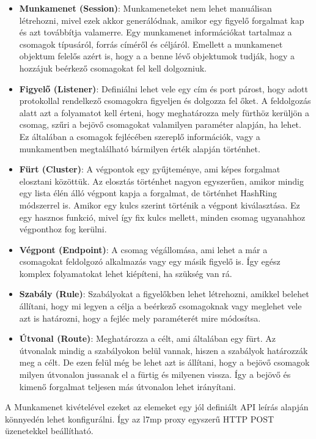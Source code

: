 \begin{itemize}
	\item \textbf{Munkamenet (Session)}: Munkameneteket nem lehet manuálisan létrehozni,
	mivel ezek akkor generálódnak, amikor egy figyelő forgalmat kap és azt 
	továbbítja valamerre. Egy munkamenet információkat tartalmaz a csomagok típusáról,
	forrás címéről és céljáról. Emellett a munkamenet objektum felelős azért is, hogy a
	a benne lévő objektumok tudják, hogy a hozzájuk beérkező csomagokat fel kell dolgozniuk. 
	\item \textbf{Figyelő (Listener)}: Definiálni lehet vele egy cím és port párost, hogy
	adott protokollal rendelkező csomagokra figyeljen és dolgozza fel őket. A feldolgozás
	alatt azt a folyamatot kell érteni, hogy meghatározza mely fürthöz kerüljön a csomag,
	szűri a bejövő csomagokat valamilyen paraméter alapján, ha lehet. Ez általában 
	a csomagok fejlécében szereplő információk, vagy a munkamentben megtalálható bármilyen
	érték alapján történhet. 
	\item \textbf{Fürt (Cluster)}: A végpontok egy gyűjteménye, ami képes forgalmat elosztani
	közöttük. Az elosztás történhet nagyon egyszerűen, amikor mindig egy lista élén álló
	végpont kapja a forgalmat, de történhet HashRing módszerrel is. Amikor egy kulcs szerint
	történik a végpont kiválasztása. Ez egy hasznos funkció, mivel így fix kulcs mellett,
	minden csomag ugyanahhoz végponthoz fog kerülni. 
	\item \textbf{Végpont (Endpoint)}: A csomag végállomása, ami lehet a már a csomagokat
	feldolgozó alkalmazás vagy egy másik figyelő is. Így egész komplex folyamatokat 
	lehet kiépíteni, ha szükség van rá. 
	\item \textbf{Szabály (Rule)}: Szabályokat a figyelőkben lehet létrehozni, amikkel
	belehet állítani, hogy mi legyen a célja a beérkező csomagoknak vagy meglehet vele azt
	is határozni, hogy a fejléc mely paraméterét mire módosítsa. 
	\item \textbf{Útvonal (Route)}: Meghatározza a célt, ami általában egy fürt. Az 
	útvonalak mindig a szabályokon belül vannak, hiszen a szabályok határozzák meg a célt.
	De ezen felül még be lehet azt is állítani, hogy a bejövő csomagok milyen útvonalon 
	jussanak el a fürtig és milyenen vissza. Így a bejövő és kimenő forgalmat teljesen 
	más útvonalon lehet irányítani.
\end{itemize}

A Munkamenet kivételével ezeket az elemeket egy jól definiált API leírás alapján 
könnyedén lehet konfigurálni. Így az l7mp proxy egyszerű HTTP POST üzenetekkel 
beállítható.

